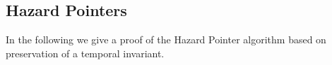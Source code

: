 
\subsection{Hazard Pointers}\label{sec:proofs-hazard}


In the following we give a proof of the Hazard Pointer algorithm 
based on preservation of a temporal invariant.

% 
% 


